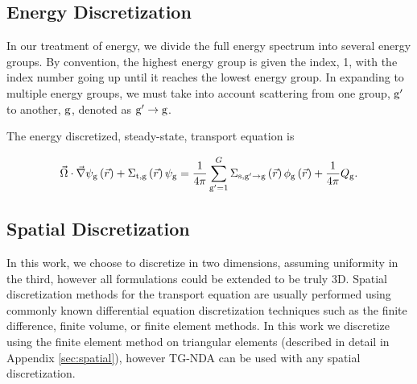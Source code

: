 \subsection{Energy Discretization}
In our treatment of energy, we divide the full energy spectrum into several energy groups. By convention, the highest energy group is given the index, 1, with the index number going up until it reaches the lowest energy group. In expanding to multiple energy groups, we must take into account scattering from one group, $\mathrm{g}'$ to another, $\mathrm{g}$, denoted as $\mathrm{g}' \rightarrow \mathrm{g} $. 

The energy discretized, steady-state, transport equation is

 \begin{equation}
  \vec{\Omega} \cdot \vec{\nabla} \psi_{\mathrm{g}} \left(\vec{r}\right)+ \Sigma_{\mathrm{t}, \mathrm{g}}\left(\vec{r}\right)\psi_{\mathrm{g}} = \frac{1}{4 \pi} \sum\limits_{\mathrm{g}'=1}^{G}\Sigma_{\mathrm{s}, \mathrm{g}' \rightarrow \mathrm{g}}\left(\vec{r}\right) \phi_{\mathrm{g}}\left(\vec{r}\right) + \frac{1}{4 \pi} Q_{\mathrm{g}}.
  \label{eq:transport-energy}
 \end{equation}


\subsection{Spatial Discretization}
In this work, we choose to discretize in two dimensions, assuming uniformity in the third, however all formulations could be extended to be truly 3D. Spatial discretization methods for the transport equation are usually performed using commonly known differential equation discretization techniques such as the finite difference, finite volume, or finite element methods. In this work we discretize using the finite element method on triangular elements (described in detail in Appendix \ref{sec:spatial}), however TG-NDA can be used with any spatial discretization. 



